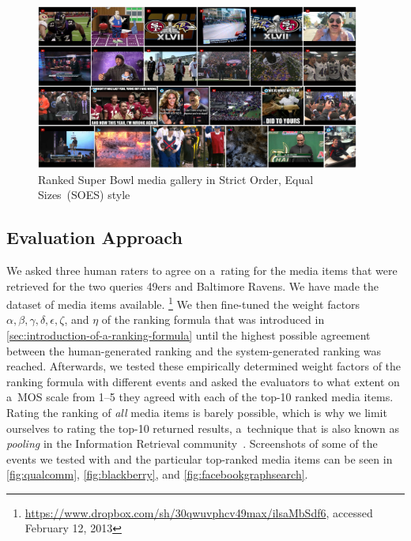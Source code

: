 \begin{figure}
  \centering
  \includegraphics[width=0.95\textwidth,height=0.9\textheight,keepaspectratio]{strict_order.png}
  \caption[Ranked Super Bowl media gallery in Strict Order, Equal Sizes style]
  {Ranked Super Bowl media gallery in Strict Order, Equal Sizes~(SOES) style }
  \label{fig:strict_order}
\end{figure}  

\subsection{Evaluation Approach}

We asked three human raters to agree on a~rating for the media items
that were retrieved for the two queries 49ers and Baltimore Ravens.
We have made the dataset of media items available.%
\footnote{\url{https://www.dropbox.com/sh/30qwuvphcv49max/ilsaMbSdf6},
accessed February 12, 2013}
We then fine-tuned the weight factors
$ \alpha, \beta, \gamma, \delta, \epsilon, \zeta $, and $ \eta $ of the ranking formula
that was introduced in \autoref{sec:introduction-of-a-ranking-formula}
until the highest possible agreement between the human-generated ranking
and the system-generated ranking was reached.
Afterwards, we tested these empirically determined weight factors of the ranking formula
with different events and asked the evaluators to what extent
on a~MOS scale from 1--5 they agreed with each of the top-10 ranked media items.
Rating the ranking of \emph{all} media items is barely possible,
which is why we limit ourselves to rating the top-10 returned results,
a~technique that is also known as \emph{pooling}
in the Information Retrieval community~\cite{liu2009learningtorank}.
Screenshots of some of the events we tested with
and the particular top-ranked media items can be seen in 
\autoref{fig:qualcomm}, \autoref{fig:blackberry}, and \autoref{fig:facebookgraphsearch}.


